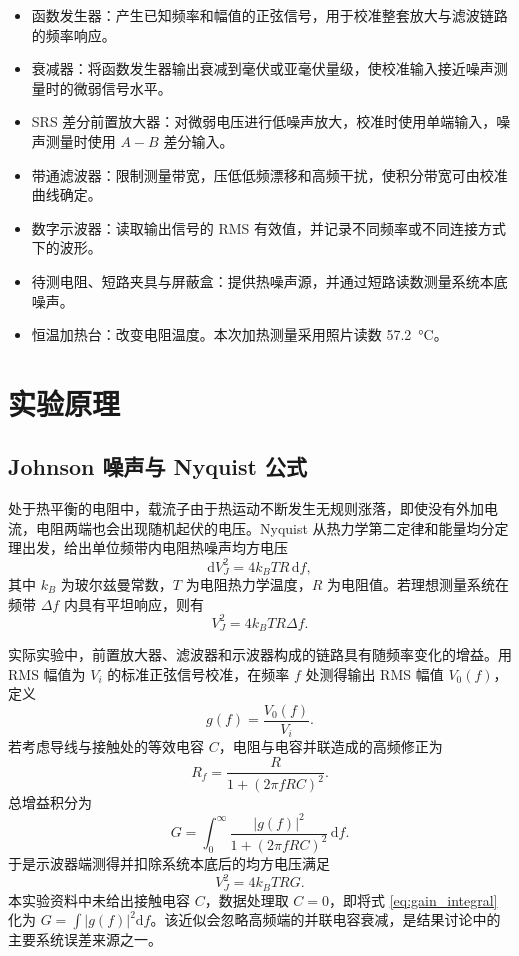 \documentclass[11pt]{article}
\begin{document}
\begin{itemize}
    \item 函数发生器：产生已知频率和幅值的正弦信号，用于校准整套放大与滤波链路的频率响应。
    \item 衰减器：将函数发生器输出衰减到毫伏或亚毫伏量级，使校准输入接近噪声测量时的微弱信号水平。
    \item SRS 差分前置放大器：对微弱电压进行低噪声放大，校准时使用单端输入，噪声测量时使用 $A-B$ 差分输入。
    \item 带通滤波器：限制测量带宽，压低低频漂移和高频干扰，使积分带宽可由校准曲线确定。
    \item 数字示波器：读取输出信号的 RMS 有效值，并记录不同频率或不同连接方式下的波形。
    \item 待测电阻、短路夹具与屏蔽盒：提供热噪声源，并通过短路读数测量系统本底噪声。
    \item 恒温加热台：改变电阻温度。本次加热测量采用照片读数 \SI{57.2}{\degreeCelsius}。
\end{itemize}

\section{实验原理}

\subsection{Johnson 噪声与 Nyquist 公式}

处于热平衡的电阻中，载流子由于热运动不断发生无规则涨落，即使没有外加电流，电阻两端也会出现随机起伏的电压。Nyquist 从热力学第二定律和能量均分定理出发，给出单位频带内电阻热噪声均方电压
\begin{equation}
    \mathrm d V_J^2=4k_BTR\,\mathrm df ,
\end{equation}
其中 $k_B$ 为玻尔兹曼常数，$T$ 为电阻热力学温度，$R$ 为电阻值。若理想测量系统在频带 $\Delta f$ 内具有平坦响应，则有
\begin{equation}
    V_J^2=4k_BTR\Delta f .
\end{equation}

实际实验中，前置放大器、滤波器和示波器构成的链路具有随频率变化的增益。用 RMS 幅值为 $V_i$ 的标准正弦信号校准，在频率 $f$ 处测得输出 RMS 幅值 $V_0(f)$，定义
\begin{equation}
    g(f)=\frac{V_0(f)}{V_i}.
\end{equation}
若考虑导线与接触处的等效电容 $C$，电阻与电容并联造成的高频修正为
\begin{equation}
    R_f=\frac{R}{1+(2\pi fRC)^2}.
\end{equation}
总增益积分为
\begin{equation}
    G=\int_0^\infty \frac{|g(f)|^2}{1+(2\pi fRC)^2}\,\mathrm df.
    \label{eq:gain_integral}
\end{equation}
于是示波器端测得并扣除系统本底后的均方电压满足
\begin{equation}
    V_J^2=4k_BTRG.
    \label{eq:johnson}
\end{equation}
本实验资料中未给出接触电容 $C$，数据处理取 $C=0$，即将式 \eqref{eq:gain_integral} 化为 $G=\int |g(f)|^2\mathrm df$。该近似会忽略高频端的并联电容衰减，是结果讨论中的主要系统误差来源之一。
\end{document}
